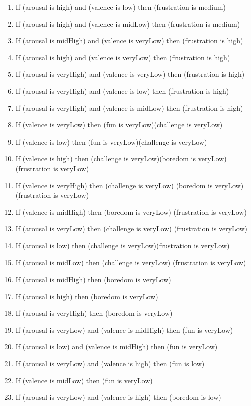 \begin{enumerate}
\item If (arousal is high) and (valence is low) then (frustration is medium)
\item If (arousal is high) and (valence is midLow) then (frustration is medium)
\item If (arousal is midHigh) and (valence is veryLow) then (frustration is high)
\item If (arousal is high) and (valence is veryLow) then (frustration is high)
\item If (arousal is veryHigh) and (valence is veryLow) then (frustration is high)
\item If (arousal is veryHigh) and (valence is low) then (frustration is high)
\item If (arousal is veryHigh) and (valence is midLow) then (frustration is high)
\item If (valence is veryLow) then (fun is veryLow)(challenge is veryLow)
\item If (valence is low) then (fun is veryLow)(challenge is veryLow)
\item If (valence is high) then (challenge is veryLow)(boredom is veryLow)(frustration is veryLow)
\item If (valence is veryHigh) then (challenge is veryLow) (boredom is veryLow)(frustration is veryLow)
\item If (valence is midHigh) then (boredom is veryLow) (frustration is veryLow)
\item If (arousal is veryLow) then (challenge is veryLow) (frustration is veryLow)
\item If (arousal is low) then (challenge is veryLow)(frustration is veryLow)
\item If (arousal is midLow) then (challenge is veryLow) (frustration is veryLow)
\item If (arousal is midHigh) then (boredom is veryLow)
\item If (arousal is high) then (boredom is veryLow)
\item If (arousal is veryHigh) then (boredom is veryLow)
\item If (arousal is veryLow) and (valence is midHigh) then (fun is veryLow)
\item If (arousal is low) and (valence is midHigh) then (fun is veryLow)
\item If (arousal is veryLow) and (valence is high) then (fun is low)
\item If (valence is midLow) then (fun is veryLow)
\item If (arousal is veryLow) and (valence is high) then (boredom is low)

\end{enumerate}
